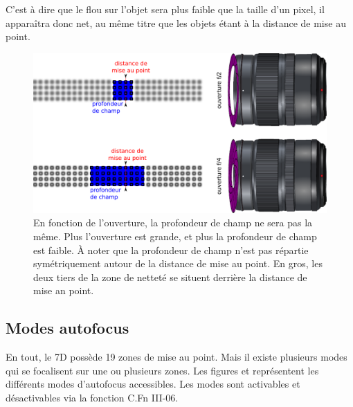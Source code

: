 \documentclass[a4paper,twoside]{article}
\begin{document}
\begin{remarque}
C'est à dire que le flou sur l'objet sera plus faible que la taille d'un pixel, il apparaîtra donc net, au même titre que les objets étant à la distance de mise au point.
\end{remarque}

\begin{figure}[htb]
\centering
\includegraphics[width=0.65\linewidth]{figure/depth_of_field.pdf}
\caption{En fonction de l'ouverture, la profondeur de champ ne sera pas la même. Plus l'ouverture est grande, et plus la profondeur de champ est faible. À noter que la profondeur de champ n'est pas répartie symétriquement autour de la distance de mise au point. En gros, les deux tiers de la zone de netteté se situent derrière la distance de mise an point.}\label{fig:mise_au_point}
\end{figure}

\subsection{Modes autofocus}
En tout, le 7D possède 19 zones de mise au point. Mais il existe plusieurs modes qui se focalisent sur une ou plusieurs zones. Les figures  et  représentent les différents modes d'autofocus accessibles. Les modes sont activables et désactivables via la fonction C.Fn III-06.
\end{document}
